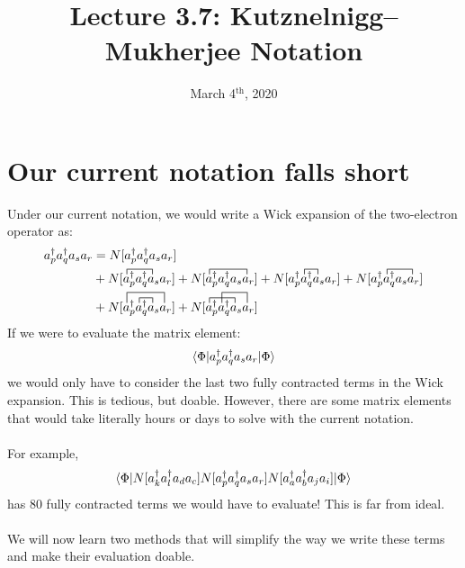 \documentclass{article}
\title{Lecture 3.7:  Kutznelnigg--Mukherjee Notation}
\date{March 4$^{\text{th}}$, 2020}
\newcommand{\fctr}{\contraction}
\newcommand{\dg}{\ensuremath{^\dagger} }
\begin{document}
\maketitle
\section{Our current notation falls short}
Under our current notation, we would write a Wick expansion of the two-electron operator as: 
\begin{align*}
a_p\dg a_q\dg a_s a_r  &= N[a_p\dg a_q\dg a_s a_r  ] \\ 
&+ N[ \fctr{}{x}{{}_1a_q\dg }{x} a_p\dg a_q\dg a_s a_r  ] + N[ \fctr{}{x}{{}_1a_q\dg  a_s }{x} a_p\dg a_q\dg a_s a_r  ] 
+ N[ \fctr{a_p\dg }{x}{{}_2}{x} a_p\dg a_q\dg a_s a_r  ] +  N[ \fctr{a_p\dg }{x}{{}_2 a_s }{x} a_p\dg a_q\dg a_s a_r  ] \\
&+ N[ \fctr{a_p\dg }{x}{{}_2}{x} \fctr[2ex]{}{x}{{}_1a_q\dg  a_s }{x}      a_p\dg a_q\dg a_s a_r  ] 
+ N[ \fctr{}{x}{{}_1a_q\dg }{x}  \fctr[2ex]{a_p\dg }{x}{{}_2 a_s }{x} a_p\dg a_q\dg a_s a_r  ] 
\end{align*}
If we were to evaluate the matrix element: 
\[\braket{\Phi | a_p\dg a_q\dg a_s a_r  | \Phi} \]
we would only have to consider the last two fully contracted terms in the Wick expansion. 
This is tedious, but doable.
However, there are some matrix elements that would take literally hours or days to solve with the current notation.
\\ \\
For example,
\[\braket{\Phi | N[a_k\dg a_l\dg a_d a_c] N[a_p\dg a_q\dg a_s a_r] N[a_a\dg a_b\dg a_j a_i] | \Phi} \]
has 80 fully contracted terms we would have to evaluate! 
This is far from ideal. 
\\ \\
We will now learn two methods that will simplify the way we write these terms and make their evaluation doable.
\end{document}
